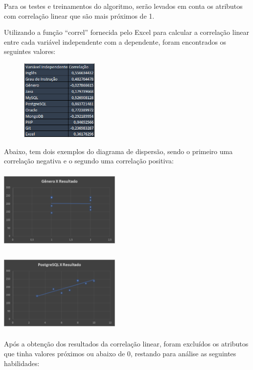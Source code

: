 \documentclass[conference]{IEEEtran}
\begin{document}
Para os testes e treinamentos do algoritmo, serão levados em conta os atributos com correlação linear que são mais próximos de 1.

Utilizando a função “correl” fornecida pelo Excel para calcular a correlação linear entre cada variável independente com a dependente, foram encontrados os seguintes valores:

\vspace{7mm}
\centerline{\includegraphics[width=60mm,height=40mm,keepaspectratio]{Tabela6.png}}
\vspace{7mm}

Abaixo, tem dois exemplos do diagrama de dispersão, sendo o primeiro uma correlação negativa e o segundo uma correlação positiva:

\vspace{7mm}
\centerline{\includegraphics[width=60mm,height=40mm,keepaspectratio]{Grafico1.png}}
\vspace{7mm}

\vspace{7mm}
\centerline{\includegraphics[width=60mm,height=40mm,keepaspectratio]{Grafico2.png}}
\vspace{7mm}

Após a obtenção dos resultados da correlação linear, foram excluídos os atributos que tinha valores próximos ou abaixo de 0, restando para análise as seguintes habilidades:
\end{document}
